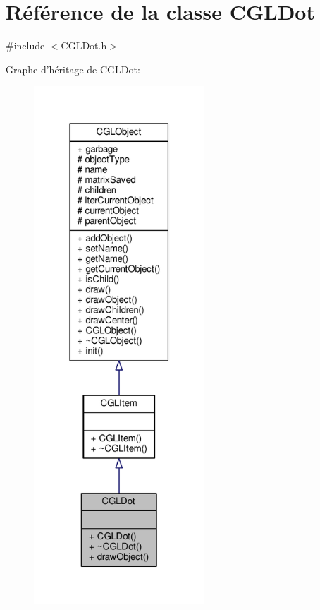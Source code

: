 \hypertarget{class_c_g_l_dot}{\section{Référence de la classe C\-G\-L\-Dot}
\label{class_c_g_l_dot}
}


{\ttfamily \#include $<$C\-G\-L\-Dot.\-h$>$}



Graphe d'héritage de C\-G\-L\-Dot\-:\nopagebreak
\begin{figure}[H]
\begin{center}
\leavevmode
\includegraphics[height=550pt]{d3/d95/class_c_g_l_dot__inherit__graph}
\end{center}
\end{figure}


